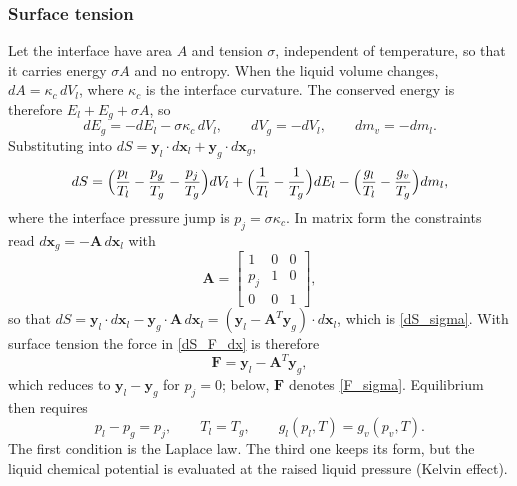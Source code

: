 \subsubsection{Surface tension}
Let the interface have area $A$ and tension $\sigma$, independent of temperature, so that it carries energy $\sigma A$ and no entropy. When the liquid volume changes, $d A=\kappa_c\,d V_l$, where $\kappa_c$ is the interface curvature. The conserved energy is therefore $E_l+E_g+\sigma A$, so
\begin{equation}
d E_g=-d E_l-\sigma\kappa_c\,d V_l,\qquad d V_g=-d V_l,\qquad d m_v=-d m_l .
\end{equation}
Substituting into $d S=\boldsymbol{y}_l\cdot d\boldsymbol{x}_l+\boldsymbol{y}_g\cdot d\boldsymbol{x}_g$,
\begin{equation}\label{dS_sigma}
d S=\Bigl(\frac{p_l}{T_l}-\frac{p_g}{T_g}-\frac{p_{j}}{T_g}\Bigr)d V_l
+\Bigl(\frac1{T_l}-\frac1{T_g}\Bigr)d E_l-\Bigl(\frac{g_l}{T_l}-\frac{g_v}{T_g}\Bigr)d m_l,
\end{equation}
where the interface pressure jump is $p_{j} = \sigma\kappa_c$. In matrix form the constraints read $d\boldsymbol{x}_g=-\boldsymbol{A}\,d\boldsymbol{x}_l$ with
\begin{equation}\label{A_sigma}
\boldsymbol{A}=\begin{bmatrix}1&0&0\\p_{j}&1&0\\0&0&1\end{bmatrix},
\end{equation}
so that $dS=\boldsymbol{y}_l\cdot d\boldsymbol{x}_l-\boldsymbol{y}_g\cdot\boldsymbol{A}\,d\boldsymbol{x}_l=(\boldsymbol{y}_l-\boldsymbol{A}^T\boldsymbol{y}_g)\cdot d\boldsymbol{x}_l$, which is \eqref{dS_sigma}. With surface tension the force in \eqref{dS_F_dx} is therefore
\begin{equation}\label{F_sigma}
\boldsymbol{F}=\boldsymbol{y}_l-\boldsymbol{A}^T\boldsymbol{y}_g,
\end{equation}
which reduces to $\boldsymbol{y}_l-\boldsymbol{y}_g$ for $p_{j}=0$; below, $\boldsymbol{F}$ denotes \eqref{F_sigma}. Equilibrium then requires
\begin{equation}
p_l-p_g=p_{j},\qquad T_l=T_g,\qquad g_l(p_l,T)=g_v(p_v,T).
\end{equation}
The first condition is the Laplace law. The third one keeps its form, but the liquid chemical potential is evaluated at the raised liquid pressure (Kelvin effect).


